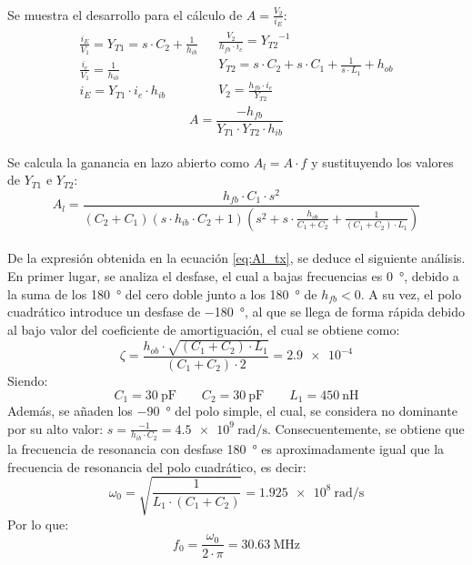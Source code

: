 \paragraph{}
Se muestra el desarrollo para el c\'alculo de $A = \frac{V_2}{i_E}$:
\[
\begin{array}{rl} 
      \begin{array}{l}
   \frac{i_E}{V_1} = Y_{T1} = s\cdot C_2 + \frac{1}{h_{ib}} \\
   \frac{i_e}{V_{1}} = \frac{1}{h_{ib}} \\
   i_E = Y_{T1} \cdot i_e \cdot h_{ib}
      \end{array}
      &
      \begin{array}{r}
   \frac{V_2}{h_{fb}\cdot i_e} = {Y_{T2}}^{-1} \\
   Y_{T2} = s\cdot C_2 + s\cdot C_1 + \frac{1}{s\cdot L_1} + h_{ob} \\
   V_2 = \frac{h_{fb}\cdot i_e}{Y_{T2}} 
      \end{array}
\end{array}
\]
\begin{equation}
   A = \frac{-h_{fb}}{Y_{T1} \cdot Y_{T2} \cdot h_{ib}} 
\end{equation}
\paragraph{}
Se calcula la ganancia en lazo abierto como $A_l = A \cdot f$ y sustituyendo los valores de $Y_{T1}$ e $Y_{T2}$:
\begin{equation}
   \label{eq:Al_tx}
   A_l = \frac{h_{fb} \cdot C_1 \cdot s^2}{ \left( C_2+C_1 \right) \left( s \cdot h_{ib} \cdot C_2 + 1\right) \left( s^2 + s \cdot \frac{h_{ob}}{C_1 + C_2} + \frac{1}{(C_1 + C_2)\cdot L_1}\right) }
\end{equation}
\paragraph{}
De la expresi\'on obtenida en la ecuaci\'on \ref{eq:Al_tx}, se deduce el siguiente an\'alisis. 
En primer lugar, se analiza el desfase, el cual a bajas frecuencias es \SI{0}{\degree}, debido a la suma de los \SI{180}{\degree} del cero doble junto a los \SI{180}{\degree} de $h_{fb} < 0$. A su vez, el polo cuadr\'atico introduce un desfase de \SI{-180}{\degree}, al que se llega de forma r\'apida debido al bajo valor del coeficiente de amortiguaci\'on, el cual se obtiene como:$$\zeta = \frac{h_{ob} \cdot \sqrt{(C_1+C_2) \cdot L_1}}{(C_1+C_2) \cdot 2} = \num{2.9e-4}$$
Siendo:
$$C_1 = \SI{30}{\pico\farad} \quad \quad C_2 = \SI{30}{\pico\farad} \quad \quad L_1 = \SI{450}{\nano\henry}$$
Adem\'as, se añaden los \SI{-90}{\degree} del polo simple, el cual, se considera no dominante por su alto valor: $s = \frac{-1}{h_{ib} \cdot C_2} = \SI{4.5e9}{\radian\per\second}$. 
Consecuentemente, se obtiene que la frecuencia de resonancia con desfase \SI{180}{\degree} es aproximadamente igual que la frecuencia de resonancia del polo cuadrático, es decir:
$$\omega_0 = \sqrt{\frac{1}{L_1 \cdot (C_1 + C_2)}} = \SI{1.925e8}{\radian\per\second}$$ 
Por lo que:
\begin{equation}
   f_0 = \frac{\omega_0}{2\cdot\pi} = \SI{30.63}{\mega\hertz}
\end{equation}
